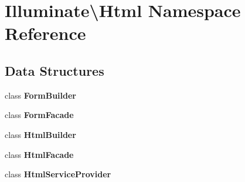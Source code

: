 \section{Illuminate\textbackslash{}Html Namespace Reference}
\label{namespace_illuminate_1_1_html}
\subsection*{Data Structures}
\begin{DoxyCompactItemize}
\item 
class {\bf Form\+Builder}
\item 
class {\bf Form\+Facade}
\item 
class {\bf Html\+Builder}
\item 
class {\bf Html\+Facade}
\item 
class {\bf Html\+Service\+Provider}
\end{DoxyCompactItemize}
